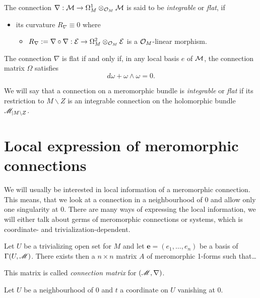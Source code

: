 \begin{defn}[Flatness (0.12.2)]
  The connection $\nabla:\mathcal{M}\to \Omega_M^1\otimes_{\mathcal{O}_M}\mathcal{M}$ is said to be
  \emph{integrable} or \emph{flat}, if
  \begin{itemize}
    \item its curvature $R_\nabla\equiv0$
    where
    \begin{itemize}
      \item $R_\nabla:=\nabla\circ\nabla:\mathcal{E}\to\Omega_M^2\otimes_{\mathcal{O}_M}\mathcal{E}$
        is a $\mathcal{O}_M$-linear morphism.
    \end{itemize}
  \end{itemize}
  \begin{prop}[0.12.4]
    The connection $\nabla$ is flat if and only if, in any local basis $e$ of
    $\mathcal{M}$, the connection matrix $\Omega$ satisfies
    \[
      d\omega + \omega \wedge \omega = 0.
    \]
  \end{prop}
  We will say that a connection on a meromorphic bundle is \emph{integrable} or
  \emph{flat} if its restriction to $M\backslash Z$ is an integrable connection
  on the holomorphic bundle $\mathscr{M}_{|M\backslash Z}$.
\end{defn}

\section{Local expression of meromorphic connections}
\begin{comment}
  \begin{itemize}
    \item \cite{sabbah2007isomonodromic} p.28
    \item \cite{thboalch} p.2
  \end{itemize}
\end{comment}
We will usually be interested in local information of a meromorphic connection.
This means, that we look at a connection in a neighbourhood of $0$ and  allow
only one singularity at $0$.
There are many ways of expressing the local information, we will either talk
about germs of meromorphic connections or systems, which is coordinate-
and trivialization-dependent.

\begin{paracol}{2}\sloppy
\switchcolumn[0]\noindent
  Let $U$ be a trivializing open set for $M$ and let
  $\textbf{e}=(e_1,\dots,e_n)$ be a basis of $\Gamma(U,\mathscr{M})$.
  There exists then a $n\times n$ matrix $A$ of meromorphic 1-forms such
  that\dots
  \begin{defn}
    This matrix is called \emph{connection matrix} for $(\mathscr{M},\nabla)$.
  \end{defn}
\switchcolumn[1]\noindent
  Let $U$ be a neighbourhood of $0$ and $t$ a coordinate on $U$ vanishing at
  $0$.
\end{paracol}

